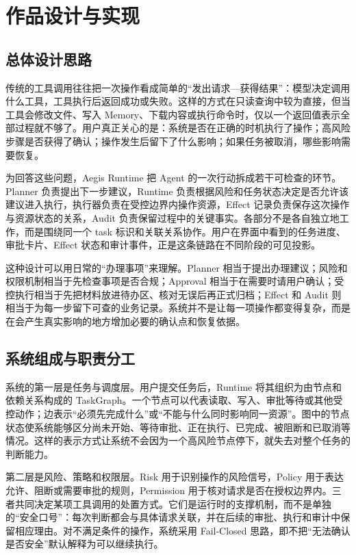 \chapter{作品设计与实现}

\section{总体设计思路}

传统的工具调用往往把一次操作看成简单的“发出请求—获得结果”：模型决定调用什么工具，工具执行后返回成功或失败。这样的方式在只读查询中较为直接，但当工具会修改文件、写入 Memory、下载内容或执行命令时，仅以一个返回值表示全部过程就不够了。用户真正关心的是：系统是否在正确的时机执行了操作；高风险步骤是否获得了确认；操作发生后留下了什么影响；如果任务被取消，哪些影响需要恢复。

为回答这些问题，Aegis Runtime 把 Agent 的一次行动拆成若干可检查的环节。Planner 负责提出下一步建议，Runtime 负责根据风险和任务状态决定是否允许该建议进入执行，执行器负责在受控边界内操作资源，Effect 记录负责保存这次操作与资源状态的关系，Audit 负责保留过程中的关键事实。各部分不是各自独立地工作，而是围绕同一个 task 标识和关联关系协作。用户在界面中看到的任务进度、审批卡片、Effect 状态和审计事件，正是这条链路在不同阶段的可见投影。

这种设计可以用日常的“办理事项”来理解。Planner 相当于提出办理建议；风险和权限机制相当于先检查事项是否合规；Approval 相当于在需要时请用户确认；受控执行相当于先把材料放进待办区、核对无误后再正式归档；Effect 和 Audit 则相当于为每一步留下可查的业务记录。系统并不是让每一项操作都变得复杂，而是在会产生真实影响的地方增加必要的确认点和恢复依据。

\section{系统组成与职责分工}

系统的第一层是任务与调度层。用户提交任务后，Runtime 将其组织为由节点和依赖关系构成的 TaskGraph。一个节点可以代表读取、写入、审批等待或其他受控动作；边表示“必须先完成什么”或“不能与什么同时影响同一资源”。图中的节点状态使系统能够区分尚未开始、等待审批、正在执行、已完成、被阻断和已取消等情况。这样的表示方式让系统不会因为一个高风险节点停下，就失去对整个任务的判断能力。

第二层是风险、策略和权限层。Risk 用于识别操作的风险信号，Policy 用于表达允许、阻断或需要审批的规则，Permission 用于核对请求是否在授权边界内。三者共同决定某项工具调用的处置方式。它们是运行时的支撑机制，而不是单独的“安全口号”：每次判断都会与具体请求关联，并在后续的审批、执行和审计中保留相应理由。对不满足条件的操作，系统采用 Fail-Closed 思路，即不把“无法确认是否安全”默认解释为可以继续执行。

